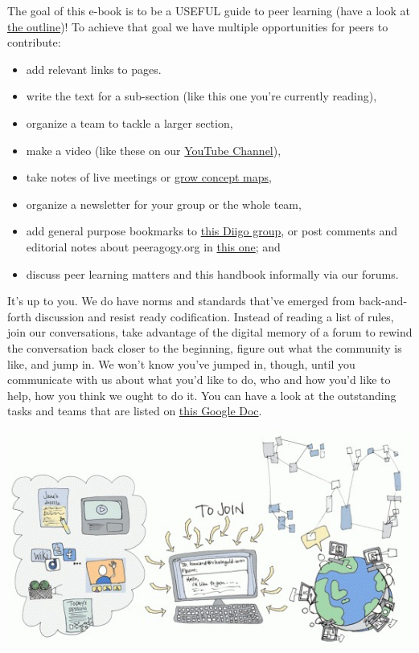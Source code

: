 The goal of this e-book is to be a USEFUL guide to peer learning (have a
look at
\href{http://socialmediaclassroom.com/host/peeragogy/wiki/initial-outline-source-book}{the
outline})! To achieve that goal we have multiple opportunities for peers
to contribute:

\begin{itemize}
\item
  add relevant links to pages.
\item
  write the text for a sub-section (like this one you're currently
  reading),
\item
  organize a team to tackle a larger section,
\item
  make a video (like these on our
  \href{http://www.youtube.com/channel/UCIQY4ja8e4Br-i9U5KnmyZQ}{YouTube
  Channel}),
\item
  take notes of live meetings or
  \href{http://cmapspublic3.ihmc.us/rid=1K81VLSK7-1RL0RQ4-WZK/Peeragogy\%20Cmap.cmap}{grow
  concept maps,}
\item
  organize a newsletter for your group or the whole team,
\item
  add general purpose bookmarks to
  \href{http://groups.diigo.com/group/peeragogy-handbook}{this Diigo
  group}, or post comments and editorial notes about peeragogy.org in
  \href{http://groups.diigo.com/group/peering-into-peeragogy\%20}{this
  one}; and
\item
  discuss peer learning matters and this handbook informally via our
  forums.
\end{itemize}

It's up to you. We do have norms and standards that've emerged from
back-and-forth discussion and resist ready codification. Instead of
reading a list of rules, join our conversations, take advantage of the
digital memory of a forum to rewind the conversation back closer to the
beginning, figure out what the community is like, and jump in. We won't
know you've jumped in, though, until you communicate with us about what
you'd like to do, who and how you'd like to help, how you think we ought
to do it. You can have a look at the outstanding tasks and teams that
are listed on
\href{https://docs.google.com/document/d/1\_2I-z-Pt5NUKk-fpy4jsqxFeXbWS4ao4sIhkxCcRVeI/edit\#}{this
Google Doc}.

\begin{center}
\href{http://peeragogy.org/wp-content/uploads/2012/03/lots\_going\_on\_color\_1000.gif}{\includegraphics[width=.9\textwidth]{./pictures/lots_going_on.jpg}}
\end{center}

